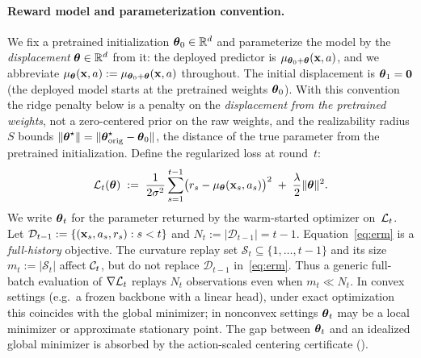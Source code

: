 \paragraph{Reward model and parameterization convention.}
We fix a pretrained initialization $\boldsymbol{\theta}_0\in\mathbb{R}^d$ and parameterize the model
by the \emph{displacement} $\boldsymbol{\theta}\in\mathbb{R}^d$ from it: the deployed predictor is
$\mu_{\boldsymbol{\theta}_0+\boldsymbol{\theta}}(\mathbf{x},a)$, and we abbreviate
$\mu_{\boldsymbol{\theta}}(\mathbf{x},a):=\mu_{\boldsymbol{\theta}_0+\boldsymbol{\theta}}(\mathbf{x},a)$ throughout.  The initial
displacement is $\boldsymbol{\theta}_1=\mathbf 0$ (the deployed model starts at the pretrained
weights $\boldsymbol{\theta}_0$).  With this convention the ridge penalty below is a penalty
on the \emph{displacement from the pretrained weights}, not a zero-centered prior
on the raw weights, and the realizability radius $S$ bounds
$\|\boldsymbol{\theta}^\star\|=\|\boldsymbol{\theta}^\star_{\mathrm{orig}}-\boldsymbol{\theta}_0\|$, the distance of
the true parameter from the pretrained initialization.
Define the regularized loss at round~$t$:
\begin{equation}\label{eq:erm}
  \mathcal{L}_t(\boldsymbol{\theta})
  \;:=\;
    \frac{1}{2\sigma^2}\sum_{s=1}^{t-1}
      \bigl(r_s - \mu_{\boldsymbol{\theta}}(\mathbf{x}_s,a_s)\bigr)^2
    \;+\; \frac{\lambda}{2}\|\boldsymbol{\theta}\|^2 .
\end{equation}
We write $\boldsymbol{\theta}_t$ for the parameter returned by the warm-started
optimizer on~$\mathcal{L}_t$.
Let $\mathcal D_{t-1}:=\{(\mathbf{x}_s,a_s,r_s):s<t\}$ and
$N_t:=|\mathcal D_{t-1}|=t-1$.  Equation~\eqref{eq:erm} is a
\emph{full-history} objective.  The curvature replay set
$\mathcal S_t\subseteq\{1,\ldots,t-1\}$ and its size
$m_t:=|\mathcal S_t|$ affect $\mathcal{C}_t$, but do not replace
$\mathcal D_{t-1}$ in~\eqref{eq:erm}.  Thus a generic full-batch evaluation of
$\nabla\mathcal{L}_t$ replays $N_t$ observations even when $m_t\ll N_t$.
In convex settings (e.g.\ a frozen backbone with a linear head), under exact
optimization this coincides with the global minimizer; in nonconvex settings $\boldsymbol{\theta}_t$
may be a local minimizer or approximate stationary point.
The gap between $\boldsymbol{\theta}_t$ and an idealized global minimizer is absorbed
by the action-scaled centering certificate ().

